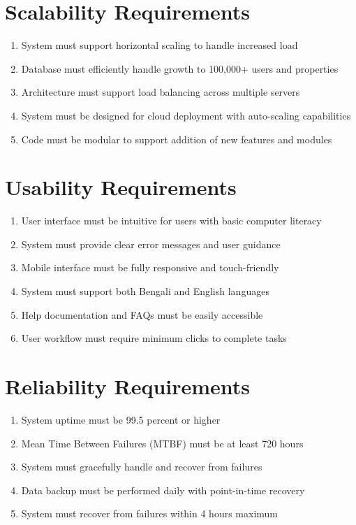 \documentclass[12pt,a4paper]{report}
\begin{document}
\section{Scalability Requirements}
\begin{enumerate}
    \item System must support horizontal scaling to handle increased load
    \item Database must efficiently handle growth to 100,000+ users and properties
    \item Architecture must support load balancing across multiple servers
    \item System must be designed for cloud deployment with auto-scaling capabilities
    \item Code must be modular to support addition of new features and modules
\end{enumerate}

\section{Usability Requirements}
\begin{enumerate}
    \item User interface must be intuitive for users with basic computer literacy
    \item System must provide clear error messages and user guidance
    \item Mobile interface must be fully responsive and touch-friendly
    \item System must support both Bengali and English languages
    \item Help documentation and FAQs must be easily accessible
    \item User workflow must require minimum clicks to complete tasks
\end{enumerate}

\section{Reliability Requirements}
\begin{enumerate}
    \item System uptime must be 99.5 percent or higher
    \item Mean Time Between Failures (MTBF) must be at least 720 hours
    \item System must gracefully handle and recover from failures
    \item Data backup must be performed daily with point-in-time recovery
    \item System must recover from failures within 4 hours maximum
\end{enumerate}
\end{document}

